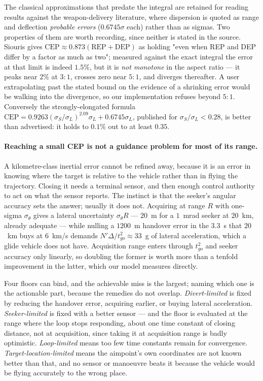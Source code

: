 \documentclass[11pt,a4paper]{article}
\theoremstyle{definition}
\numberwithin{equation}{section}
\begin{document}
The classical approximations that predate the integral are retained for reading results against the weapon-delivery literature, where dispersion is quoted as range and deflection \emph{probable errors} ($0.6745\sigma$ each) rather than as sigmas. Two properties of them are worth recording, since neither is stated in the source. Siouris gives $\mathrm{CEP} \approx 0.873(\mathrm{REP} + \mathrm{DEP})$ as holding "even when REP and DEP differ by a factor as much as two"; measured against the exact integral the error at that limit is indeed $1.5\%$, but it is \emph{not monotone} in the aspect ratio --- it peaks near $2\%$ at $3\!:\!1$, crosses zero near $5\!:\!1$, and diverges thereafter. A user extrapolating past the stated bound on the evidence of a shrinking error would be walking into the divergence, so our implementation refuses beyond $5\!:\!1$. Conversely the strongly-elongated formula $\mathrm{CEP} = 0.9263(\sigma_S/\sigma_L)^{2.09}\sigma_L + 0.6745\sigma_L$, published for $\sigma_S/\sigma_L < 0.28$, is better than advertised: it holds to $0.1\%$ out to at least $0.35$.

\paragraph{Reaching a small CEP is not a guidance problem for most of its range.} A kilometre-class inertial error cannot be refined away, because it is an error in knowing where the target is relative to the vehicle rather than in flying the trajectory. Closing it needs a terminal sensor, and then enough control authority to act on what the sensor reports. The instinct is that the seeker's angular accuracy sets the answer; usually it does not. Acquiring at range $R$ with one-sigma $\sigma_\theta$ gives a lateral uncertainty $\sigma_\theta R$ --- $20$~m for a $1$~mrad seeker at $20$~km, already adequate --- while nulling a $1200$~m handover error in the $3.3$~s that $20$~km buys at $6$~km/s demands $N'\Delta/t_{go}^2 \approx 33$~g of lateral acceleration, which a glide vehicle does not have. Acquisition range enters through $t_{go}^2$ and seeker accuracy only linearly, so doubling the former is worth more than a tenfold improvement in the latter, which our model measures directly.

Four floors can bind, and the achievable miss is the largest; naming which one is the actionable part, because the remedies do not overlap. \emph{Divert-limited} is fixed by reducing the handover error, acquiring earlier, or buying lateral acceleration. \emph{Seeker-limited} is fixed with a better sensor --- and the floor is evaluated at the range where the loop stops responding, about one time constant of closing distance, not at acquisition, since taking it at acquisition range is badly optimistic. \emph{Loop-limited} means too few time constants remain for convergence. \emph{Target-location-limited} means the aimpoint's own coordinates are not known better than that, and no sensor or manoeuvre beats it because the vehicle would be flying accurately to the wrong place.
\end{document}
